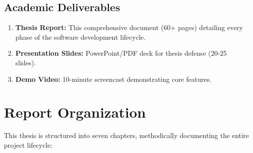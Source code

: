 \documentclass[12pt, a4paper]{report}
\begin{document}
\subsection{Academic Deliverables}

\begin{enumerate}
    \item \textbf{Thesis Report:} This comprehensive document (60+ pages) detailing every phase of the software development lifecycle.
    
    \item \textbf{Presentation Slides:} PowerPoint/PDF deck for thesis defense (20-25 slides).
    
    \item \textbf{Demo Video:} 10-minute screencast demonstrating core features.
\end{enumerate}

\section{Report Organization}

This thesis is structured into seven chapters, methodically documenting the entire project lifecycle:
\end{document}
